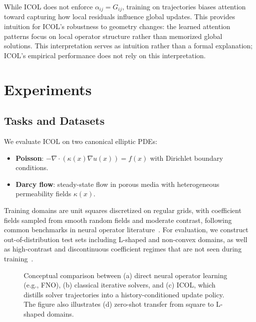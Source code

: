 \documentclass{article}
\begin{document}
While ICOL does not enforce $\alpha_{ij} = G_{ij}$, training on trajectories biases attention toward capturing how local residuals influence global updates. This provides intuition for ICOL’s robustness to geometry changes: the learned attention patterns focus on local operator structure rather than memorized global solutions. This interpretation serves as intuition rather than a formal explanation; ICOL’s empirical performance does not rely on this interpretation.

\section{Experiments}

\subsection{Tasks and Datasets}

We evaluate ICOL on two canonical elliptic PDEs:
\begin{itemize}
\item \textbf{Poisson}: $-\nabla \cdot (\kappa(x)\nabla u(x)) = f(x)$ with Dirichlet boundary conditions.
\item \textbf{Darcy flow}: steady-state flow in porous media with heterogeneous permeability fields $\kappa(x)$.
\end{itemize}
Training domains are unit squares discretized on regular grids, with coefficient fields sampled from smooth random fields and moderate contrast, following common benchmarks in neural operator literature~\cite{li2020fourier,lu2021deeponet,brandstetter2022message}. For evaluation, we construct out-of-distribution test sets including L-shaped and non-convex domains, as well as high-contrast and discontinuous coefficient regimes that are not seen during training~\cite{lu2022comprehensive,dong2023operatorreview}.

\begin{figure}[t]
    \centering
    \fbox{\rule{0pt}{2.0in}\rule{0.9\linewidth}{0pt}}
    \caption{Conceptual comparison between (a) direct neural operator learning (e.g., FNO), (b) classical iterative solvers, and (c) ICOL, which distills solver trajectories into a history-conditioned update policy. The figure also illustrates (d) zero-shot transfer from square to L-shaped domains.}
    \label{fig:concept}
\end{figure}
\end{document}
